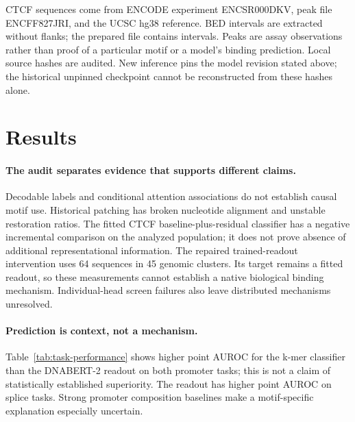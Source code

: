 CTCF sequences come from ENCODE experiment ENCSR000DKV, peak file ENCFF827JRI, and the UCSC hg38 reference. BED intervals are extracted without flanks; the prepared file contains \CTCFSequences{} intervals. Peaks are assay observations rather than proof of a particular motif or a model's binding prediction. Local source hashes are audited. New inference pins the model revision stated above; the historical unpinned checkpoint cannot be reconstructed from these hashes alone.

\section{Results}
\paragraph{The audit separates evidence that supports different claims.}
Decodable labels and conditional attention associations do not establish causal motif use. Historical patching has broken nucleotide alignment and unstable restoration ratios. The fitted CTCF baseline-plus-residual classifier has a negative incremental comparison on the analyzed population; it does not prove absence of additional representational information. The repaired trained-readout intervention uses 64 sequences in 45 genomic clusters. Its target remains a fitted readout, so these measurements cannot establish a native biological binding mechanism. Individual-head screen failures also leave distributed mechanisms unresolved.
\paragraph{Prediction is context, not a mechanism.}
Table~\ref{tab:task-performance} shows higher point AUROC for the k-mer classifier than the DNABERT-2 readout on both promoter tasks; this is not a claim of statistically established superiority. The readout has higher point AUROC on splice tasks. Strong promoter composition baselines make a motif-specific explanation especially uncertain.
\begin{table}[t]
\centering\normalsize\setlength{\tabcolsep}{3pt}
\caption{Held-out AUROC with 95\% sequence-bootstrap intervals, generated from saved per-sequence predictions.}
\label{tab:task-performance}
\PerformanceTable
\end{table}

